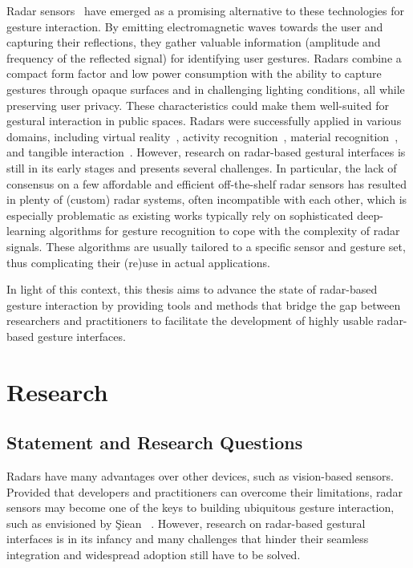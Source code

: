 Radar sensors~\cite{Yeo:2016} have emerged as a promising alternative to these technologies for gesture interaction. 
By emitting electromagnetic waves towards the user and capturing their reflections, they gather valuable information (\eg amplitude and frequency of the reflected signal) for identifying user gestures.
%
Radars combine a compact form factor and low power consumption with the ability to capture gestures through opaque surfaces and in challenging lighting conditions, all while preserving user privacy. These characteristics could make them well-suited for gestural interaction in public spaces.
%
Radars were successfully applied in various domains, including virtual reality~\cite{Huesser:2021}, activity recognition~\cite{Avrahami:2018,Avrahami:2020}, material recognition~\cite{Flintoff:2018, Yeo:2016}, and tangible interaction~\cite{Yeo:2019}. 
%
However, research on radar-based gestural interfaces is still in its early stages and presents several challenges.
%
In particular, the lack of consensus on a few affordable and efficient off-the-shelf radar sensors has resulted in plenty of (custom) radar systems, often incompatible with each other, which is especially problematic as existing works typically rely on sophisticated deep-learning algorithms for gesture recognition to cope with the complexity of radar signals. These algorithms are usually tailored to a specific sensor and gesture set, thus complicating their (re)use in actual applications.

In light of this context, this thesis aims to advance the state of radar-based gesture interaction by providing tools and methods that bridge the gap between researchers and practitioners to facilitate the development of highly usable radar-based gesture interfaces.



\section{Research} \label{sec:introduction:research}

\subsection{Statement and Research Questions} \label{sec:introduction:research:research-questions}
Radars have many advantages over other devices, such as vision-based sensors. Provided that developers and practitioners can overcome their limitations, radar sensors may become one of the keys to building ubiquitous gesture interaction, such as envisioned by \c{S}iean \etal~\cite{Siean:2023}.
%
However, research on radar-based gestural interfaces is in its infancy and many challenges that hinder their seamless integration and widespread adoption still have to be solved.

